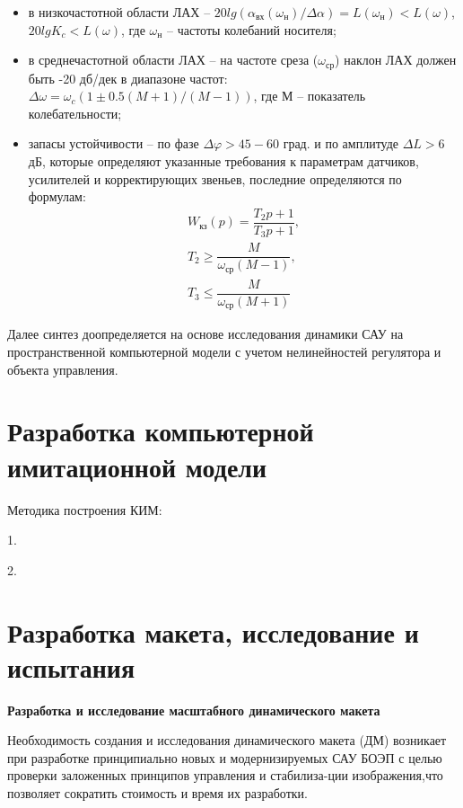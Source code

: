 \begin{itemize}
	\item в низкочастотной области ЛАХ – $20 lg(\alpha_{\textit{вх}}(\omega_{\textit{н}}) / \varDelta\alpha)=L(\omega_{\textit{н}})<L(\omega)$, 
	$20 lg K_c < L(\omega)$, где 
	$\omega_{\textit{н}}$ – частоты колебаний носителя;
	\item в среднечастотной области ЛАХ – на частоте среза ($\omega_{\textit{ср}}$) наклон ЛАХ должен быть -20 дб/дек в диапазоне частот: \\
	$\varDelta\omega = \omega_c ( 1 \pm 0.5(M + 1)/(M - 1) )$, где М – показатель колебательности;
	\item запасы устойчивости – 
	по фазе $\varDelta\varphi>45-60$ град. и 
	по амплитуде $\varDelta L>6$ дБ,
	которые определяют указанные требования к параметрам датчиков, усилителей и корректирующих звеньев, последние определяются по формулам:
	\begin{equation}
	\label{eq:p2:16-a2}
	\begin{alignedat}{2}
	W_{\textit{кз}}(p) = \dfrac{T_2p+1}{T_3p+1} ,\\
	T_2 \geq \dfrac{M}{\omega_{\textit{ср}}(M-1)} ,\\
	T_3 \leq \dfrac{M}{\omega_{\textit{ср}}(M+1)}
	\end{alignedat}
	\end{equation}
\end{itemize}

Далее синтез доопределяется на основе исследования динамики САУ на пространственной компьютерной модели \cite[]{Malivanov-a2-9} с учетом нелинейностей регулятора и объекта управления.

\section{Разработка компьютерной имитационной модели} \label{sec:ch2/sec7}

Методика построения КИМ:

1.

2.


\section{Разработка макета, исследование и испытания } \label{sec:ch2/sec8}

\textbf{Разработка и исследование масштабного динамического макета}

Необходимость создания и исследования динамического макета (ДМ) возникает при разработке принципиально новых и модернизируемых САУ БОЭП с целью проверки заложенных принципов управления и стабилиза-ции изображения,что позволяет сократить стоимость и время их разработки. 

